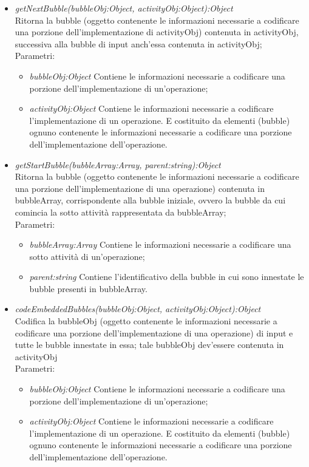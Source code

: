 \documentclass[../DefinizioneDiProdotto.tex]{subfiles}
\begin{document}
\begin{itemize}
\begin{itemize}
					\item \emph{getNextBubble(bubbleObj:Object, activityObj:Object):Object} \\ 
					Ritorna la bubble (oggetto contenente le informazioni necessarie a codificare una porzione dell'implementazione di activityObj) contenuta in activityObj, successiva alla bubble di input anch'essa contenuta in activityObj; \\
					Parametri:
					\begin{itemize}
						\item \emph{bubbleObj:Object} Contiene le informazioni necessarie a codificare una porzione dell'implementazione di un'operazione;
						\item \emph{activityObj:Object} Contiene le informazioni necessarie a codificare l'implementazione di un operazione. E costituito da elementi (bubble) ognuno contenente le informazioni necessarie a codificare una porzione dell'implementazione dell'operazione.
					\end{itemize}	
					
					\item \emph{getStartBubble(bubbleArray:Array, parent:string):Object} \\ 
					Ritorna la bubble (oggetto contenente le informazioni necessarie a codificare una porzione dell'implementazione di una operazione) contenuta in bubbleArray, corrispondente alla bubble iniziale, ovvero la bubble da cui comincia la sotto attività rappresentata da bubbleArray; \\
					Parametri:
					\begin{itemize}
						\item \emph{bubbleArray:Array} Contiene le informazioni necessarie a codificare una sotto attività di un'operazione;
						\item \emph{parent:string} Contiene l'identificativo della bubble in cui sono innestate le bubble presenti in bubbleArray.	
					\end{itemize}		
					
					\item \emph{codeEmbeddedBubbles(bubbleObj:Object, activityObj:Object):Object} \\ 
					Codifica la bubbleObj (oggetto contenente le informazioni necessarie a codificare una porzione dell'implementazione di una operazione) di input e tutte le bubble innestate in essa; tale bubbleObj dev'essere contenuta in activityObj \\
					Parametri:
					\begin{itemize}
						\item \emph{bubbleObj:Object} Contiene le informazioni necessarie a codificare una porzione dell'implementazione di un'operazione;
						\item \emph{activityObj:Object} Contiene le informazioni necessarie a codificare l'implementazione di un operazione. E costituito da elementi (bubble) ognuno contenente le informazioni necessarie a codificare una porzione dell'implementazione dell'operazione.
					\end{itemize}
					

\end{itemize}
\end{itemize}
\end{document}
